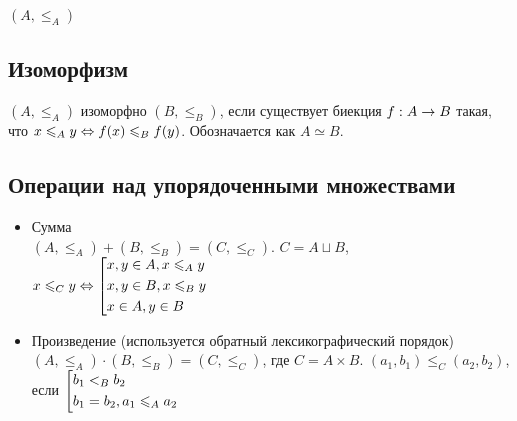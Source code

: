 \begin{example}
	$(A, \le_A)$
\end{example}


\subsection{Изоморфизм}

\begin{definition}
	$(A, \le_A)$ изоморфно $(B, \le_B)$, если существует биекция $f : A \rightarrow B$ такая, что $x \leqslant_A y \Leftrightarrow f(x) \leqslant_B f(y)$. Обозначается как $A \simeq B$.
\end{definition}

\subsection{Операции над упорядоченными множествами}

\begin{itemize}
	\item Сумма \\
	$(A, \le_A) + (B, \le_B) = (C, \le_C)$. $C = A \sqcup B$, $x \leqslant_C y \Leftrightarrow \left[\begin{aligned}&{x, y \in A, x \leqslant_A y} \\ &{x, y \in B, x \leqslant_B y} \\ &{x \in A, y \in B}\end{aligned}\right.$ %
	
	\item Произведение (используется обратный лексикографический порядок) \\
	$(A, \le_A) \cdot (B, \le_B) = (C, \le_C)$, где $C = A \times B$. $(a_1, b_1) \le_C (a_2, b_2)$, если $\left[\begin{aligned}&{b_1 <_B b_2} \\ &{b_1 = b_2, a_1 \leqslant_A a_2}\end{aligned}\right.$
\end{itemize}